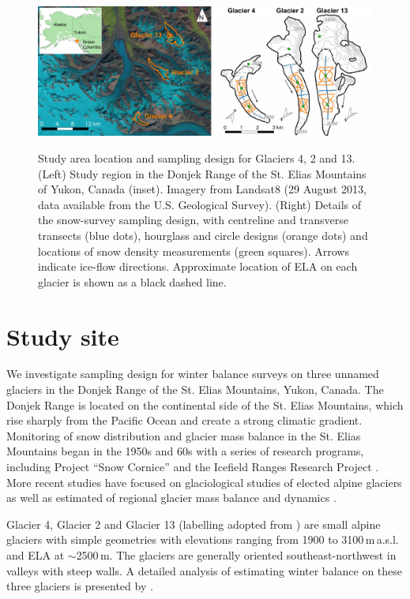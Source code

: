 \documentclass[twocolumn,letterpaper]{igs}
\begin{document}
\begin{figure}
	\centering
	\includegraphics[width =\textwidth]{PaperII-StudySite.pdf}\\
	\caption{Study area location and sampling design for Glaciers 4, 2 and 13. (Left) Study region in the Donjek Range of the St. Elias Mountains of Yukon, Canada (inset). Imagery from Landsat8 (29 August 2013, data available from the U.S. Geological Survey). (Right) Details of the snow-survey sampling design, with centreline and transverse transects (blue dots), hourglass and circle designs (orange dots) and locations of snow density measurements (green squares). Arrows indicate ice-flow directions. Approximate location of ELA on each glacier is shown as a black dashed line.}
	\label{fig:Sampling}
\end{figure}

\section{Study site}

We investigate sampling design for winter balance surveys on three unnamed glaciers in the Donjek Range of the St. Elias Mountains, Yukon, Canada. The Donjek Range is located on the continental side of the St. Elias Mountains, which rise sharply from the Pacific Ocean and create a strong climatic gradient. Monitoring of snow distribution and glacier mass balance in the St. Elias Mountains began in the 1950s and 60s with a series of research programs, including Project ``Snow Cornice''  and the Icefield Ranges Research Project \citep{Wood1948, Danby2003}. More recent studies have focused on glaciological studies of elected alpine glaciers \citep[e.g.][]{Clarke2014} as well as estimated of regional glacier mass balance and dynamics \citep[e.g.][]{Arendt2008, Burgess2013,Waechter2015}.


Glacier 4, Glacier 2 and Glacier 13 (labelling adopted from \cite{Crompton2016}) are small alpine glaciers with simple geometries with elevations ranging from 1900 to 3100\,m\,a.s.l. and ELA at $\sim$2500\,m. The glaciers are generally oriented southeast-northwest in valleys with steep walls. A detailed analysis of estimating winter balance on these three glaciers is presented by \cite{Pulwicki2017}.
\end{document}
